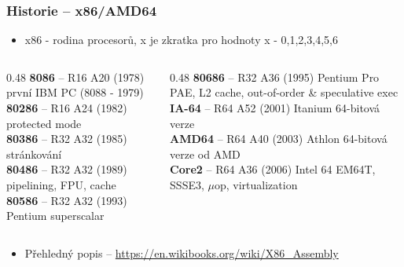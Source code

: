 \documentclass{beamer}
\begin{document}
\begin{frame}
\frametitle{Historie -- x86/AMD64}
\begin{itemize}
\item x86 - rodina procesorů, x je zkratka pro hodnoty x - 0,1,2,3,4,5,6
\end{itemize}

\begin{columns}[t,onlytextwidth]
\begin{column}{0.48\textwidth}
\textbf{8086} -- R16 A20 (1978) první IBM PC (8088 - 1979) \\
\textbf{80286} -- R16 A24 (1982) protected mode\\
\textbf{80386} -- R32 A32 (1985) stránkování\\
\textbf{80486} -- R32 A32 (1989) pipelining, FPU, cache\\
\textbf{80586} -- R32 A32 (1993) Pentium superscalar\\
\end{column}
\begin{column}{0.48\textwidth}  
\textbf{80686} -- R32 A36 (1995) Pentium Pro PAE, L2 cache, out-of-order \& speculative exec\\
\textbf{IA-64} -- R64 A52 (2001) Itanium 64-bitová verze\\
\textbf{AMD64} -- R64 A40 (2003) Athlon 64-bitová verze od AMD\\
\textbf{Core2} -- R64 A36 (2006) Intel 64 EM64T, SSSE3, $\mu$op, virtualization
\end{column}
\end{columns}

\begin{itemize}
\item Přehledný popis -- \url{https://en.wikibooks.org/wiki/X86\_Assembly}
\end{itemize}

\end{frame}
\end{document}
